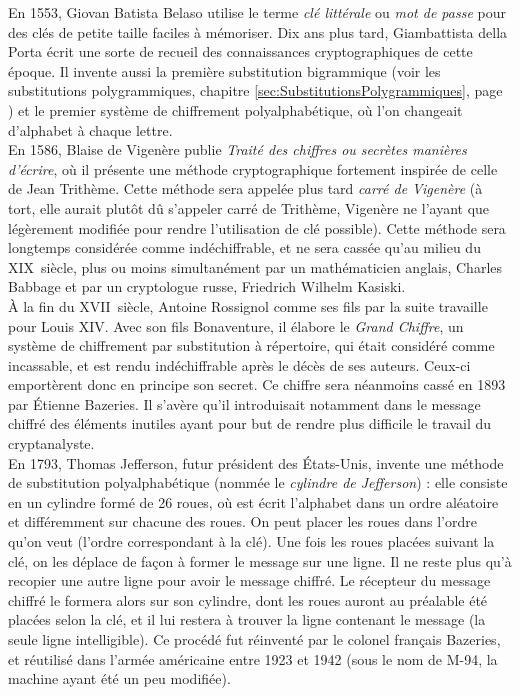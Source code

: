 En 1553, Giovan Batista Belaso utilise le terme \emph{clé littérale}
ou \emph{mot de passe} pour des clés de petite taille faciles à
mémoriser. %
Dix ans plus tard, Giambattista della Porta écrit une sorte de recueil
des connaissances cryptographiques de cette époque. Il invente aussi
la première substitution bigrammique (voir les substitutions
polygrammiques, chapitre \ref{sec:SubstitutionsPolygrammiques}, page
\pageref{sec:SubstitutionsPolygrammiques}) et le premier système de
chiffrement polyalphabétique, où l'on changeait d'alphabet à
chaque lettre. \\

En 1586, Blaise de Vigenère publie \emph{Traité des chiffres
  ou secrètes manières d'écrire}, où il présente une méthode
cryptographique fortement inspirée de celle de Jean Trithème. Cette
méthode sera appelée plus tard \emph{carré de Vigenère} (à tort,
elle aurait plutôt dû s'appeler carré de Trithème, Vigenère ne
l'ayant que légèrement modifiée pour rendre l'utilisation de clé possible).
Cette méthode sera longtemps considérée comme indéchiffrable, et ne
sera cassée qu'au milieu du XIX\ieme~siècle, plus ou moins
simultanément par un mathématicien anglais, Charles Babbage et
par un cryptologue russe, Friedrich Wilhelm Kasiski. \\

À la fin du XVII\ieme~siècle, Antoine Rossignol comme ses
fils par la suite travaille pour Louis XIV. Avec son fils
Bonaventure, il élabore le \emph{Grand Chiffre}, un système de
chiffrement par substitution à répertoire, qui était considéré comme
incassable, et est rendu indéchiffrable après le décès de ses auteurs.
Ceux-ci emportèrent donc en principe son secret. 
Ce chiffre sera néanmoins cassé en 1893 par
Étienne Bazeries. Il s'avère qu'il introduisait notamment
dans le message chiffré des éléments inutiles ayant pour but de
rendre plus difficile le travail du cryptanalyste.\\

En 1793, Thomas Jefferson, futur président des États-Unis,
invente une méthode de substitution polyalphabétique (nommée le
\emph{cylindre de Jefferson}) : elle consiste en
un cylindre formé de 26 roues, où est écrit l'alphabet dans un ordre
aléatoire et différemment sur chacune des roues. On peut placer les
roues dans l'ordre qu'on veut (l'ordre correspondant à la clé).
Une fois les roues placées suivant la clé, on les déplace de façon à
former le message sur une ligne. Il ne reste plus qu'à recopier une
autre ligne pour avoir le message chiffré. Le récepteur du message
chiffré le formera alors sur son cylindre, dont les roues auront au
préalable été placées selon la clé, et il lui restera à trouver la
ligne contenant le message (la seule ligne intelligible). Ce procédé
fut réinventé par le colonel français Bazeries, et réutilisé
dans l'armée américaine entre 1923 et 1942 (sous le nom de M-94, la
machine ayant été un peu modifiée).

